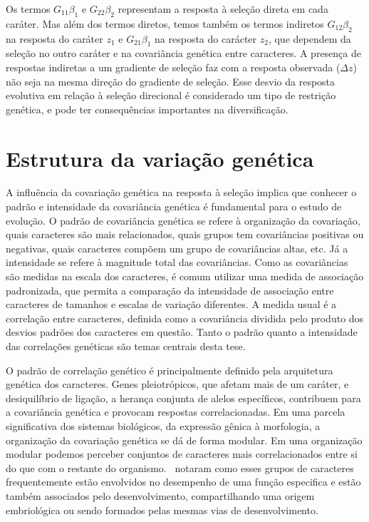 \begin{refsection}
Os termos $G_{11}\beta_{1}$ e $G_{22}\beta_{2}$ representam a resposta à
seleção direta em cada caráter. Mas além dos termos diretos, temos também  os
termos indiretos $G_{12}\beta_{2}$ na resposta do caráter $z_1$ e
$G_{21}\beta_{1}$ na resposta do carácter $z_2$, que dependem da seleção no
outro caráter e na covariância genética entre caracteres. A presença de
respostas indiretas a um gradiente de seleção faz com a resposta observada
($\Delta z$) não seja na mesma direção do gradiente de seleção. Esse desvio da
resposta evolutiva em relação à seleção direcional é considerado um tipo de
restrição genética, e pode ter consequências importantes na diversificação.

\section{Estrutura da variação genética}

A influência da covariação genética na resposta à seleção implica que conhecer
o padrão e intensidade da covariância genética é fundamental para o estudo de
evolução. O padrão de covariância genética se refere à organização da
covariação, quais caracteres são mais relacionados, quais grupos tem
covariâncias positivas ou negativas, quais caracteres compõem um grupo de
covariâncias altas, etc. Já a intensidade se refere à magnitude total das
covariâncias. Como as covariâncias são medidas na escala dos caracteres, é
comum utilizar uma medida de associação padronizada, que permita a comparação
da intensidade de associação entre caracteres de tamanhos e escalas de
variação diferentes. A medida usual é a correlação entre caracteres, definida
como a covariância dividida pelo produto dos desvios padrões dos caracteres em
questão. Tanto o padrão quanto a intensidade das correlações genéticas são temas
centrais desta tese.

O padrão de correlação genético é principalmente definido pela arquitetura
genética dos caracteres. Genes pleiotrópicos, que afetam mais de um caráter, e
desiquilíbrio de ligação, a herança conjunta de alelos específicos, contribuem
para a covariância genética e provocam respostas correlacionadas. Em uma
parcela significativa dos sistemas biológicos, da expressão gênica à
morfologia, a organização da covariação genética se dá de forma modular. Em
uma organização modular podemos perceber conjuntos de caracteres mais
correlacionados entre si do que com o restante do
organismo.~\textcite{Olson1958-qk} notaram como esses grupos de caracteres
frequentemente estão envolvidos no desempenho de uma função especifica e estão
também associados pelo desenvolvimento, compartilhando uma origem embriológica
ou sendo formados pelas mesmas vias de desenvolvimento.


\end{refsection}

